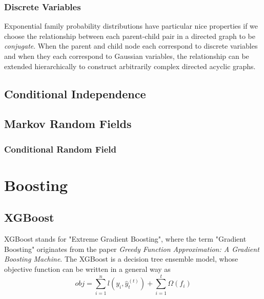 \documentclass[a3paper, 12pt]{book} %
\begin{document}
\subsection{Discrete Variables}
Exponential family probability distributions have particular nice properties if we choose the relationship between each parent-child pair in a directed graph to be \emph{conjugate}. When the parent and child node each correspond to discrete variables and when they each correspond to Gaussian variables, the relationship can be extended hierarchically to construct arbitrarily complex directed acyclic graphs.

\section{Conditional Independence}

\section{Markov Random Fields}
\subsection{Conditional Random Field}

\chapter{Boosting}
\section{XGBoost}
XGBoost stands for "Extreme Gradient Boosting", where the term "Gradient Boosting" originates from the paper \emph{Greedy Function Approximation: A Gradient Boosting Machine}. The XGBoost is a decision tree ensemble model, whose objective function can be written in a general way as 
$$obj=\sum_{i=1}^{n}{l(y_i,\hat{y}_{t}^{(t)})+\sum_{i=1}^{t}{\Omega{(f_i)}}}$$
\end{document}

